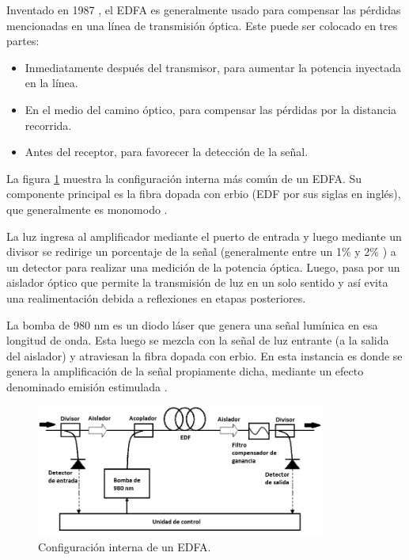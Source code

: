 
Inventado en 1987 \citep{WEBSITE:EDFA1}, el EDFA es generalmente usado para compensar las pérdidas mencionadas en una línea de transmisión óptica. Este puede ser colocado en tres partes: 

\begin{itemize}
\item Inmediatamente después del transmisor, para aumentar la potencia inyectada en la línea.
\item En el medio del camino óptico, para compensar las pérdidas por la distancia recorrida.
\item Antes del receptor, para favorecer la detección de la señal.
\end{itemize}

La figura \ref{fig:EDFAinterno} muestra la configuración interna más común de un EDFA. Su componente principal es la fibra dopada con erbio (EDF por sus siglas en inglés), que generalmente es monomodo \citep{WEBSITE:FIBRA}. 

La luz ingresa al amplificador mediante el puerto de entrada y luego mediante un divisor se redirige un porcentaje de la señal (generalmente entre un 1\% y 2\% \citep{WEBSITE:EDFA2}) a un detector para realizar una medición de la potencia óptica. Luego, pasa por un aislador óptico que permite la transmisión de luz en un solo sentido y así evita una realimentación debida a reflexiones en etapas posteriores.

La bomba de 980 nm es un diodo láser que genera una señal lumínica en esa longitud de onda. Esta luego se mezcla con la señal de luz entrante (a la salida del aislador) y atraviesan la fibra dopada con erbio. En esta instancia es donde se genera la amplificación de la señal propiamente dicha, mediante un efecto denominado emisión estimulada \citep{WEBSITE:EDFA2}\citep{WEBSITE:EMISSION}.

\begin{figure}[H]
\centering
\includegraphics[width=0.85\textwidth]{./Figures/EDFAinterno.png}
\caption{Configuración interna de un EDFA\protect\footnotemark.}
\label{fig:EDFAinterno}
\end{figure}

